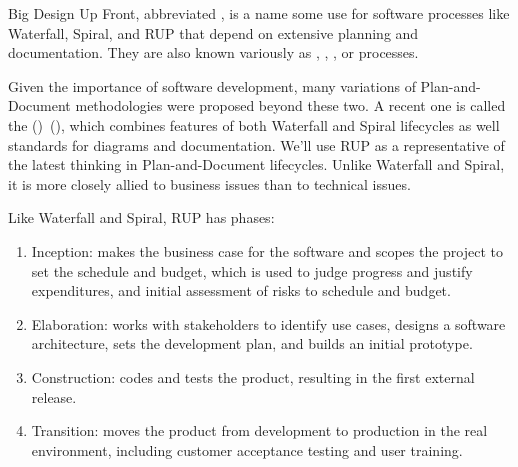 \begin{sidebar}[-0.50in]{Big Design Up Front}, abbreviated , is a name some use for software processes like
  Waterfall, Spiral, and RUP that depend on extensive planning and
  documentation. They are also known variously as ,
  , , or  processes.
  \protect{}%
  \protect{}%
  \protect{}%
  \protect{}%
  \protect{}%
\end{sidebar}
Given the importance of software development, many variations of
Plan-and-Document methodologies were proposed beyond these two. A recent
one is called the  ()~(\cite{Kruchten03}),
which combines features of both Waterfall and Spiral lifecycles
as well standards for diagrams and
documentation.
We'll use RUP as a representative of the latest thinking
in Plan-and-Document lifecycles. Unlike Waterfall and Spiral, it is more
closely allied to business issues than to technical issues.

Like Waterfall and Spiral, RUP has phases:

\begin{enumerate}

\item Inception: makes the business case for the software and scopes the project to set the schedule and budget, which is used to judge progress and justify expenditures, and initial assessment of risks to schedule and budget.

\item Elaboration: works with stakeholders to identify use cases, designs a software architecture, sets the development plan, and builds an initial prototype.

\item Construction: codes and tests the product, resulting in the first
  external release.

\item Transition: moves the product from development to production in the real environment, including customer acceptance testing and user training.
\end{enumerate}

